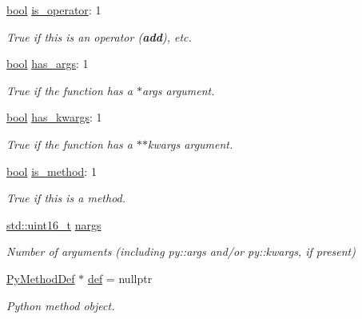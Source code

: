 \begin{DoxyCompactItemize}
\mbox{\hyperlink{asdl_8h_af6a258d8f3ee5206d682d799316314b1}{bool}} \mbox{\hyperlink{structfunction__record_ab57608549c3d2c71771feda7808a2595}{is\+\_\+operator}}\+: 1
\begin{DoxyCompactList}\small\item\em True if this is an operator ({\bfseries{add}}), etc. \end{DoxyCompactList}\item 
\mbox{\hyperlink{asdl_8h_af6a258d8f3ee5206d682d799316314b1}{bool}} \mbox{\hyperlink{structfunction__record_af05b5fc3d6d3b5bcec45bbd1c3e75f15}{has\+\_\+args}}\+: 1
\begin{DoxyCompactList}\small\item\em True if the function has a \textquotesingle{}$\ast$args\textquotesingle{} argument. \end{DoxyCompactList}\item 
\mbox{\hyperlink{asdl_8h_af6a258d8f3ee5206d682d799316314b1}{bool}} \mbox{\hyperlink{structfunction__record_af72350bd8c047108e403ff873c0a1f7d}{has\+\_\+kwargs}}\+: 1
\begin{DoxyCompactList}\small\item\em True if the function has a \textquotesingle{}$\ast$$\ast$kwargs\textquotesingle{} argument. \end{DoxyCompactList}\item 
\mbox{\hyperlink{asdl_8h_af6a258d8f3ee5206d682d799316314b1}{bool}} \mbox{\hyperlink{structfunction__record_aaad664f057b3151927053a855ec3aea0}{is\+\_\+method}}\+: 1
\begin{DoxyCompactList}\small\item\em True if this is a method. \end{DoxyCompactList}\item 
\mbox{\hyperlink{_s_d_l__config_8h_a273cf69d639a59973b6019625df33e30}{std\+::uint16\+\_\+t}} \mbox{\hyperlink{structfunction__record_a8082876641e039386647a6b6b5118d41}{nargs}}
\begin{DoxyCompactList}\small\item\em Number of arguments (including py\+::args and/or py\+::kwargs, if present) \end{DoxyCompactList}\item 
\mbox{\hyperlink{struct_py_method_def}{Py\+Method\+Def}} $\ast$ \mbox{\hyperlink{structfunction__record_a3297bc630d16b17a5559025615390ffa}{def}} = nullptr
\begin{DoxyCompactList}\small\item\em Python method object. \end{DoxyCompactList}\item 

\end{DoxyCompactItemize}
